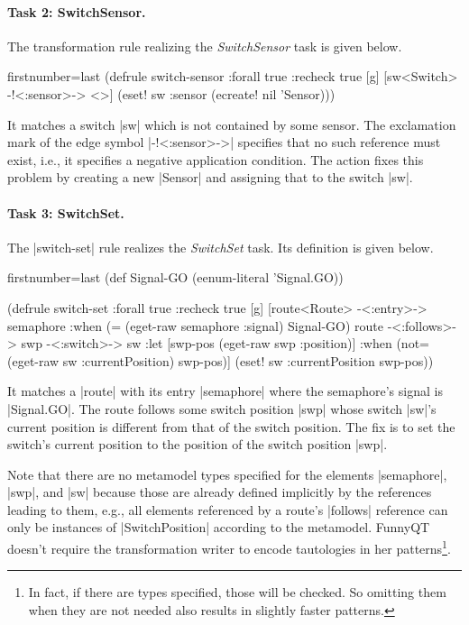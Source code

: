 \documentclass[submission]{eptcs}
\newcommand{\code}{\clojureinline}
\begin{document}
\paragraph{Task 2: SwitchSensor.}

The transformation rule realizing the \emph{SwitchSensor} task is given below.

\begin{clojurecode*}{firstnumber=last}
(defrule switch-sensor {:forall true :recheck true} [g]
  [sw<Switch> -!<:sensor>-> <>]
  (eset! sw :sensor (ecreate! nil 'Sensor)))
\end{clojurecode*}

It matches a switch \code|sw| which is not contained by some sensor.  The
exclamation mark of the edge symbol \code|-!<:sensor>->| specifies that no such
reference must exist, i.e., it specifies a negative application condition.  The
action fixes this problem by creating a new \code|Sensor| and assigning that to
the switch \code|sw|.


\paragraph{Task 3: SwitchSet.}

The \code|switch-set| rule realizes the \emph{SwitchSet} task.  Its definition
is given below.

\begin{clojurecode*}{firstnumber=last}
(def Signal-GO (eenum-literal 'Signal.GO))

(defrule switch-set {:forall true :recheck true} [g]
  [route<Route> -<:entry>-> semaphore
   :when (= (eget-raw semaphore :signal) Signal-GO)
   route -<:follows>-> swp -<:switch>-> sw
   :let [swp-pos (eget-raw swp :position)]
   :when (not= (eget-raw sw :currentPosition) swp-pos)]
  (eset! sw :currentPosition swp-pos))
\end{clojurecode*}

It matches a \code|route| with its entry \code|semaphore| where the semaphore's
signal is \code|Signal.GO|.  The route follows some switch position \code|swp|
whose switch \code|sw|'s current position is different from that of the switch
position.  The fix is to set the switch's current position to the position of
the switch position \code|swp|.

Note that there are no metamodel types specified for the elements
\code|semaphore|, \code|swp|, and \code|sw| because those are already defined
implicitly by the references leading to them, e.g., all elements referenced by
a route's \code|follows| reference can only be instances of
\code|SwitchPosition| according to the metamodel.  FunnyQT doesn't require the
transformation writer to encode tautologies in her patterns\footnote{In fact,
  if there are types specified, those will be checked.  So omitting them when
  they are not needed also results in slightly faster patterns.}.
\end{document}
